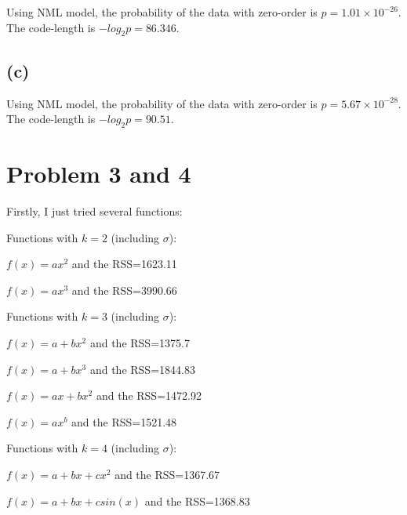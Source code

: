 \documentclass{article}
\begin{document}
Using NML model, the probability of the data with zero-order is $p=1.01 \times 10^{-26}$. The code-length is $-log_2p=86.346$. 

\subsection*{(c)}

Using NML model, the probability of the data with zero-order is $p=5.67 \times 10^{-28}$. The code-length is $-log_2p=90.51$. 

\section{Problem 3 and 4}

Firstly, I just tried several functions:
\vspace{2mm}

Functions with $k=2$ (including $\sigma$):

\vspace{1mm}

$f(x)=ax^2$ and the RSS=1623.11

\vspace{1mm}

$f(x)=ax^3$ and the RSS=3990.66

\vspace{1mm}

Functions with $k=3$ (including $\sigma$):

$f(x)=a+bx^2$ and the RSS=1375.7

\vspace{1mm}

$f(x)=a+bx^3$ and the RSS=1844.83

\vspace{1mm}

$f(x)=ax+bx^2$ and the RSS=1472.92

\vspace{1mm}

$f(x)=ax^b$ and the RSS=1521.48

\vspace{1mm}

Functions with $k=4$ (including $\sigma$):

$f(x)=a+bx+cx^2$ and the RSS=1367.67

\vspace{1mm}

$f(x)=a+bx+csin(x)$ and the RSS=1368.83

\vspace{1mm}
\end{document}
